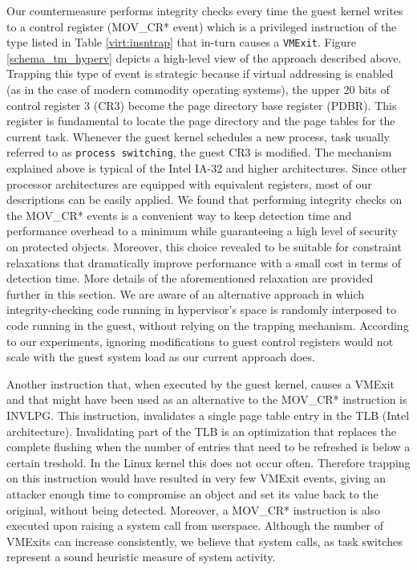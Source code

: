 Our countermeasure performs integrity checks every time the guest kernel writes to a control register (MOV\_CR* event) which is a privileged instruction of the type listed in Table \ref{virt:insntrap} that in-turn causes a \texttt{VMExit}. 
Figure \ref{schema_tm_hyperv} depicts a high-level view of the approach described above. 
Trapping this type of event is strategic because if virtual addressing is enabled (as in the case of modern commodity operating systems), the upper 20 bits of control register 3 (CR3) become the page directory base register (PDBR). This register is fundamental to locate the page directory and the page tables for the current task. Whenever the guest kernel schedules a new process, task usually referred to as \texttt{process switching}, the guest CR3 is modified. 
The mechanism explained above is typical of the Intel IA-32 and higher architectures. Since other processor architectures are equipped with equivalent registers, most of our descriptions can be easily applied. 
We found that performing integrity checks on the MOV\_CR* events is a convenient way to keep detection time and performance overhead to a minimum while guaranteeing a high level of security on protected objects. 
Moreover, this choice revealed to be suitable for constraint relaxations that dramatically improve performance with a small cost in terms of detection time. More details of the aforementioned relaxation are provided further in this section. 
We are aware of an alternative approach in which integrity-checking code running in hypervisor's space is randomly interposed to code running in the guest, without relying on the trapping mechanism. According to our experiments, ignoring modifications to guest control registers would not scale with the guest system load as our current approach does.

Another instruction that, when executed by the guest kernel, causes a VMExit and that might have been used as an alternative to the MOV\_CR* instruction is INVLPG. This instruction, invalidates a single page table entry in the TLB (Intel architecture). Invalidating part of the TLB is an optimization that replaces the complete flushing when the number of entries that need to be refreshed is below a certain treshold. 
In the Linux kernel this does not occur often. Therefore trapping on this instruction would have resulted in very few VMExit events, giving an attacker enough time to compromise an object and set its value back to the original, without being detected. Moreover, a MOV\_CR* instruction is also executed upon raising a system call from userspace. Although the number of VMExits can increase consistently, we believe that system calls, as task switches represent a sound heuristic measure of system activity.


